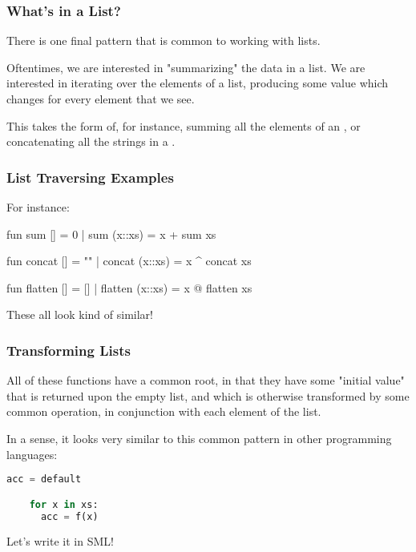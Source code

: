 \documentclass[aspectratio=169, handout]{beamer}
\begin{document}
\begin{frame}[fragile]
  \frametitle{What's in a List?}

  There is one final pattern that is common to working with lists.

  \pause
  \vspace{\fill}

  Oftentimes, we are interested in "summarizing" the data in a list. We are 
  interested in iterating over the elements of a list, producing some value which
  changes for every element that we see.

  \pause
  \vspace{\fill}

  This takes the form of, for instance, summing all the elements of an ,
  or concatenating all the strings in a .
\end{frame}

\begin{frame}[fragile]
  \frametitle{List Traversing Examples}

  For instance:

  \pause
  \begin{codeblock}
    fun sum [] = 0
      | sum (x::xs) = x + sum xs

    fun concat [] = ""
      | concat (x::xs) = x ^ concat xs

    fun flatten [] = []
      | flatten (x::xs) = x @ flatten xs
  \end{codeblock}

  \pause
  \vspace{\fill}

  These all look kind of similar!
\end{frame}

\begin{frame}[fragile]
  \frametitle{Transforming Lists}

  All of these functions have a common root, in that they have some "initial value"
  that is returned upon the empty list, and which is otherwise transformed by some
  common operation, in conjunction with each element of the list.

  \pause
  \vspace{\fill}

  In a sense, it looks very similar to this common pattern in other programming
  languages:
  
  \begin{lstlisting}[language=Python]
    acc = default 

    for x in xs:
      acc = f(x)
  \end{lstlisting}

  \pause
  \vspace{\fill}

  Let's write it in SML!
\end{frame}
\end{document}
